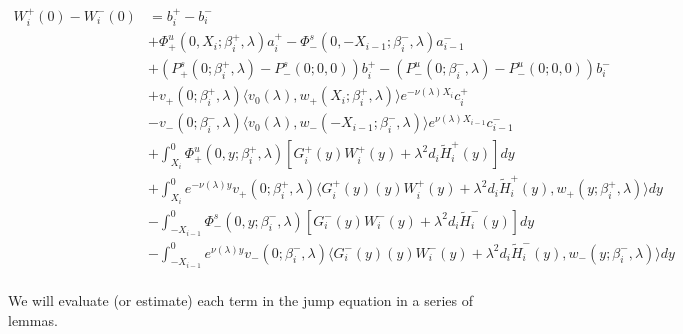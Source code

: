 \documentclass[12pt]{article}
\begin{document}
\begin{align*}
W_i^+(0) - W_i^-(0) &= b_i^+ - b_i^- \\
&+ \Phi^u_+(0, X_i; \beta_i^+, \lambda)a_i^+ - \Phi^s_-(0, -X_{i-1}; \beta_i^-, \lambda)a_{i-1}^- \\
&+(P^s_+(0; \beta_i^+, \lambda) - P^s_-(0; 0, 0))b_i^+  - (P^u_-(0; \beta_i^-, \lambda) - P^u_-(0; 0, 0))b_i^- \\
&+ v_+(0; \beta_i^+, \lambda) \langle v_0(\lambda), w_+(X_i; \beta_i^+, \lambda) \rangle e^{-\nu(\lambda)X_i} c_i^+ \\
&- v_-(0; \beta_i^-, \lambda) \langle v_0(\lambda), w_-(-X_{i-1}; \beta_i^-, \lambda) \rangle e^{\nu(\lambda)X_{i-1}} c_{i-1}^- \\
&+ \int_{X_i}^0 \Phi^u_+(0, y; \beta_i^+, \lambda) [ G_i^+(y)W_i^+(y) + \lambda^2 d_i \tilde{H}_i^+(y) ] dy \\
&+ \int_{X_i}^0 e^{-\nu(\lambda)y} v_+(0; \beta_i^+, \lambda) \langle G_i^+(y)(y)W_i^+(y) + \lambda^2 d_i \tilde{H}_i^+(y), w_+(y; \beta_i^+, \lambda) \rangle dy \\
&- \int_{-X_{i-1}}^0 \Phi^s_-(0, y; \beta_i^-, \lambda) [ G_i^-(y)W_i^-(y) + \lambda^2 d_i \tilde{H}_i^-(y) ] dy \\
&- \int_{-X_{i-1}}^0
e^{\nu(\lambda)y} v_-(0; \beta_i^-, \lambda) \langle G_i^-(y)(y)W_i^-(y) + \lambda^2 d_i \tilde{H}_i^-(y), w_-(y; \beta_i^-, \lambda) \rangle dy \\
\end{align*}

We will evaluate (or estimate) each term in the jump equation in a series of lemmas.

\end{document}
